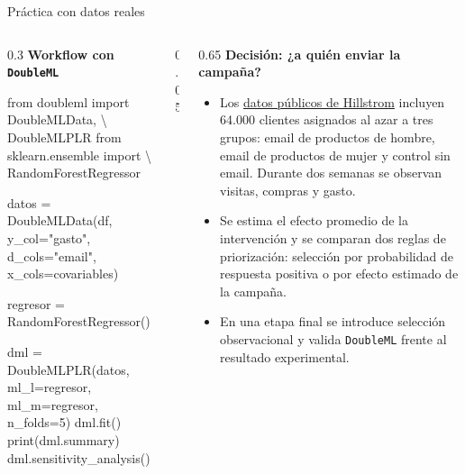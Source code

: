 \documentclass[
  8pt,
  ignorenonframetext,
  aspectratio=169,
  spanish,
]{beamer}
\newenvironment{Shaded}{\begin{snugshade}}{\end{snugshade}}
\newcommand{\BuiltInTok}[1]{\textcolor[rgb]{0.00,0.23,0.31}{#1}}
\newcommand{\DecValTok}[1]{\textcolor[rgb]{0.68,0.00,0.00}{#1}}
\newcommand{\ImportTok}[1]{\textcolor[rgb]{0.00,0.46,0.62}{#1}}
\newcommand{\NormalTok}[1]{\textcolor[rgb]{0.00,0.23,0.31}{#1}}
\newcommand{\OperatorTok}[1]{\textcolor[rgb]{0.37,0.37,0.37}{#1}}
\newcommand{\StringTok}[1]{\textcolor[rgb]{0.13,0.47,0.30}{#1}}
\providecommand{\tightlist}{%
  \setlength{\itemsep}{0pt}\setlength{\parskip}{0pt}}
\begin{document}
\begin{frame}{Práctica con datos reales}
\label{pruxe1ctica-con-datos-reales}
~

\begin{columns}[T]
\begin{column}{0.3\linewidth}
\textbf{Workflow con \texttt{DoubleML}}

\begin{Shaded}
\begin{Highlighting}[]
\ImportTok{from}\NormalTok{ doubleml }\ImportTok{import}\NormalTok{ DoubleMLData, }\OperatorTok{\textbackslash{}}
\NormalTok{   DoubleMLPLR}
\ImportTok{from}\NormalTok{ sklearn.ensemble }\ImportTok{import} \OperatorTok{\textbackslash{}}
\NormalTok{   RandomForestRegressor}

\NormalTok{datos }\OperatorTok{=}\NormalTok{ DoubleMLData(df, y\_col}\OperatorTok{=}\StringTok{"gasto"}\NormalTok{,}
\NormalTok{                     d\_cols}\OperatorTok{=}\StringTok{"email"}\NormalTok{,}
\NormalTok{                     x\_cols}\OperatorTok{=}\NormalTok{covariables)}

\NormalTok{regresor }\OperatorTok{=}\NormalTok{ RandomForestRegressor()}

\NormalTok{dml }\OperatorTok{=}\NormalTok{ DoubleMLPLR(datos,}
\NormalTok{                  ml\_l}\OperatorTok{=}\NormalTok{regresor,}
\NormalTok{                  ml\_m}\OperatorTok{=}\NormalTok{regresor,}
\NormalTok{                  n\_folds}\OperatorTok{=}\DecValTok{5}\NormalTok{)}
\NormalTok{dml.fit()}
\BuiltInTok{print}\NormalTok{(dml.summary)}
\NormalTok{dml.sensitivity\_analysis()}
\end{Highlighting}
\end{Shaded}
\end{column}

\begin{column}{0.05\linewidth}
\end{column}

\begin{column}{0.65\linewidth}
\textbf{Decisión: ¿a quién enviar la campaña?}

\begin{itemize}
\tightlist
\item
  Los
  \href{https://www.minethatdata.com/Kevin_Hillstrom_MineThatData_E-MailAnalytics_DataMiningChallenge_2008.03.20.csv}{datos
  públicos de Hillstrom} incluyen 64.000 clientes asignados al azar a
  tres grupos: email de productos de hombre, email de productos de mujer
  y control sin email. Durante dos semanas se observan visitas, compras
  y gasto.
\item
  Se estima el efecto promedio de la intervención y se comparan dos
  reglas de priorización: selección por probabilidad de respuesta
  positiva o por efecto estimado de la campaña.
\item
  En una etapa final se introduce selección observacional y valida
  \texttt{DoubleML} frente al resultado experimental.
\end{itemize}


\end{column}
\end{columns}
\end{frame}
\end{document}
